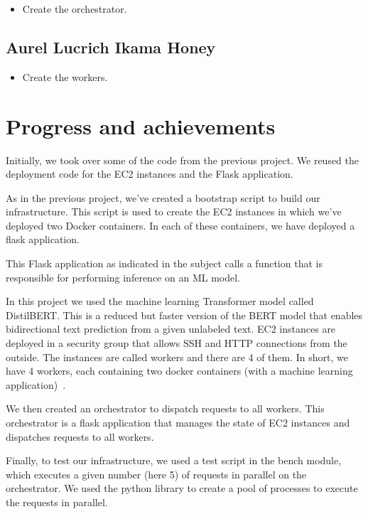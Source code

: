 \documentclass[letterpaper,headings=standardclasses,parskip=half]{scrartcl}
\begin{document}
\begin{itemize}
    \item Create the orchestrator.
\end{itemize}

\subsection*{Aurel Lucrich Ikama Honey}

\begin{itemize}
    \item Create the workers.
\end{itemize}

\section{Progress and achievements}

Initially, we took over some of the code from the previous project. We reused the deployment code for the EC2 instances and the Flask application.

As in the previous project, we've created a bootstrap script to build our infrastructure. This script is used to create the EC2 instances in which we've deployed two Docker containers. In each of these containers, we have deployed a flask application.

This Flask application as indicated in the subject calls a function that is responsible for performing inference on an ML model.



In this project we used the machine learning Transformer model called
DistilBERT. This is a reduced but faster version of the BERT model that enables
bidirectional text prediction from a given unlabeled text. EC2 instances are
deployed in a security group that allows SSH and HTTP connections from the
outside. The instances are called workers and there are 4 of them. In short, we
have 4 workers, each containing two docker containers (with a machine learning
application)~\cite{fig:infra}.

We then created an orchestrator to dispatch requests to all workers. This orchestrator is a flask application that manages the state of EC2 instances and dispatches requests to all workers.

Finally, to test our infrastructure, we used a test script in the bench module, which executes a given number (here 5) of requests in parallel on the orchestrator. We used the python library  to create a pool of processes to execute the requests in parallel.
\end{document}
